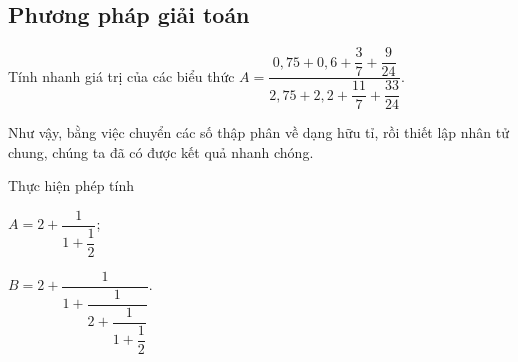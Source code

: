 \subsection{Phương pháp giải toán}
\begin{vd}%
Tính nhanh giá trị của các biểu thức $ A=\dfrac{0{,}75+0{,}6+\dfrac{3}{7}+\dfrac{9}{24}}{2{,}75+2{,}2+\dfrac{11}{7}+\dfrac{33}{24}} $.
\begin{note}
Như vậy, bằng việc chuyển các số thập phân về dạng hữu tỉ, rồi thiết lập nhân tử chung, chúng ta đã có được kết quả nhanh chóng.
\end{note}
\end{vd}
\begin{vd}%
Thực hiện phép tính
\begin{enumEX}{2}
\item $ A=2+\dfrac{1}{1+\dfrac{1}{2}} $;
\item $ B=2+\dfrac{1}{1+\dfrac{1}{2+\dfrac{1}{1+\dfrac{1}{2}}}} $.
\end{enumEX}
\end{vd}
